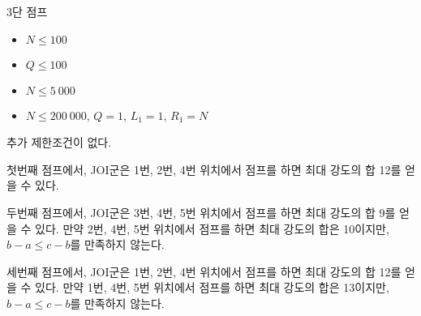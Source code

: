 \begin{problem}{3단 점프}
\begin{itemize}
	\end{itemize}
	
	
	\begin{itemize}
		\item $N \le 100$
		\item $Q \le 100$
	\end{itemize}
	
	\begin{itemize}
		\item $N \le 5\ 000$
	\end{itemize}
	
	
	\begin{itemize}
		\item $N \le 200\ 000$, $Q=1$, $L_1=1$, $R_1=N$
	\end{itemize}
	
	
	추가 제한조건이 없다.
	
	\Examples
		
	\begin{example}
	\end{example}

	\Note
	
	첫번째 점프에서, JOI군은 1번, 2번, 4번 위치에서 점프를 하면 최대 강도의 합 12를 얻을 수 있다.
	
	두번째 점프에서, JOI군은 3번, 4번, 5번 위치에서 점프를 하면 최대 강도의 합 9를 얻을 수 있다. 만약 2번, 4번, 5번 위치에서 점프를 하면 최대 강도의 합은 10이지만, $b-a \le c-b$를 만족하지 않는다.
	
	세번째 점프에서, JOI군은 1번, 2번, 4번 위치에서 점프를 하면 최대 강도의 합 12를 얻을 수 있다. 만약 1번, 4번, 5번 위치에서 점프를 하면 최대 강도의 합은 13이지만, $b-a \le c-b$를 만족하지 않는다.
	
	
	
	
\end{problem}

